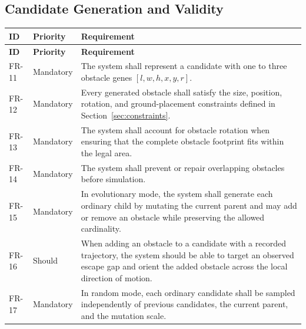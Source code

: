 \documentclass[11pt,a4paper]{report}
\begin{document}
\subsection{Candidate Generation and Validity}
\begin{longtable}{L{1.7cm} L{2.1cm} L{10.8cm}}
\toprule
\textbf{ID} & \textbf{Priority} & \textbf{Requirement}\\
\midrule
\endfirsthead
\toprule
\textbf{ID} & \textbf{Priority} & \textbf{Requirement}\\
\midrule
\endhead
FR-11 & Mandatory & The system shall represent a candidate with one to three obstacle genes $[l,w,h,x,y,r]$.\\
FR-12 & Mandatory & Every generated obstacle shall satisfy the size, position, rotation, and ground-placement constraints defined in Section~\ref{sec:constraints}.\\
FR-13 & Mandatory & The system shall account for obstacle rotation when ensuring that the complete obstacle footprint fits within the legal area.\\
FR-14 & Mandatory & The system shall prevent or repair overlapping obstacles before simulation.\\
FR-15 & Mandatory & In evolutionary mode, the system shall generate each ordinary child by mutating the current parent and may add or remove an obstacle while preserving the allowed cardinality.\\
FR-16 & Should & When adding an obstacle to a candidate with a recorded trajectory, the system should be able to target an observed escape gap and orient the added obstacle across the local direction of motion.\\
FR-17 & Mandatory & In random mode, each ordinary candidate shall be sampled independently of previous candidates, the current parent, and the mutation scale.\\
\bottomrule
\end{longtable}
\end{document}
